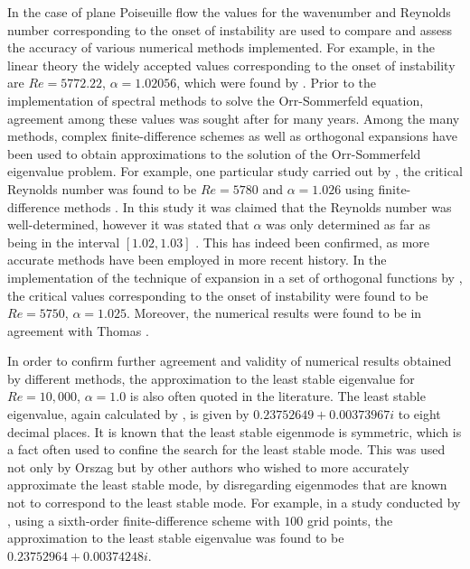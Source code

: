 \documentclass[a4paper, 12pt, twoside, openright]{article}
\numberwithin{equation}{section}
\begin{document}
In the case of plane Poiseuille flow the values for the wavenumber and Reynolds number corresponding to the onset of instability are used to compare and assess the accuracy of various numerical methods implemented. For example, in the linear theory the widely accepted values corresponding to the onset of instability are $Re=5772.22$, $\alpha=1.02056$, which were found by \cite{Orszag71}. Prior to the implementation of spectral methods to solve the Orr-Sommerfeld equation, agreement among these values was sought after for many years. Among the many methods, complex finite-difference schemes as well as orthogonal expansions have been used to obtain approximations to the solution of the Orr-Sommerfeld eigenvalue problem. For example, one particular study carried out by \cite{Thomas53}, the critical Reynolds number was found to be $Re=5780$ and $\alpha=1.026$ using finite-difference methods . In this study it was claimed that the Reynolds number was well-determined, however it was stated that $\alpha$ was only determined as far as being in the interval $[1.02,1.03]$ \citep{Thomas53}. This has indeed been confirmed, as more accurate methods have been employed in more recent history. In the implementation of the technique of expansion in a set of orthogonal functions by \cite{GroschandSalwen68}, the critical values corresponding to the onset of instability were found to be $Re=5750$, $\alpha=1.025$.  Moreover, the numerical results were found to be in agreement with Thomas \citep{GroschandSalwen68}.%

In order to confirm further agreement and validity of numerical results obtained by different methods, the approximation to the least stable eigenvalue for $Re=10,000$, $\alpha=1.0$ is also often quoted in the literature. The least stable eigenvalue, again calculated by \cite{Orszag71}, is given by $0.23752649+0.00373967i$ to eight decimal places. It is known that the least stable eigenmode is symmetric, which is a fact often used to confine the search for the least stable mode. This was used not only by Orszag but by other authors who wished to more accurately approximate the least stable mode, by disregarding eigenmodes that are known not to correspond to the least stable mode. For example, in a study conducted by \cite{GaryandHelgason70}, using a sixth-order finite-difference scheme with $100$ grid points, the approximation to the least stable eigenvalue was found to be $0.23752964+0.00374248i$. %
\end{document}
